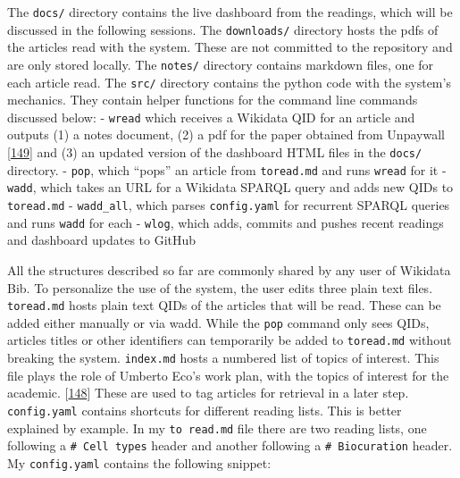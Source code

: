 The \texttt{docs/} directory contains the live dashboard from the readings, which will be discussed in the following sessions.
The \texttt{downloads/} directory hosts the pdfs of the articles read with the system.
These are not committed to the repository and are only stored locally.
The \texttt{notes/} directory contains markdown files, one for each article read.
The \texttt{src/} directory contains the python code with the system's mechanics.
They contain helper functions for the command line commands discussed below:
- \texttt{wread} which receives a Wikidata QID for an article and outputs (1) a notes document, (2) a pdf for the paper obtained from Unpaywall {[}\protect\hyperlink{ref-15luL9zZC}{149}{]} and (3) an updated version of the dashboard HTML files in the \texttt{docs/} directory.
- \texttt{pop}, which ``pops'' an article from \texttt{toread.md} and runs \texttt{wread} for it
- \texttt{wadd}, which takes an URL for a Wikidata SPARQL query and adds new QIDs to \texttt{toread.md}
- \texttt{wadd\_all}, which parses \texttt{config.yaml} for recurrent SPARQL queries and runs \texttt{wadd} for each
- \texttt{wlog}, which adds, commits and pushes recent readings and dashboard updates to GitHub

All the structures described so far are commonly shared by any user of Wikidata Bib.
To personalize the use of the system, the user edits three plain text files.
\texttt{toread.md} hosts plain text QIDs of the articles that will be read.
These can be added either manually or via wadd.
While the \texttt{pop} command only sees QIDs, articles titles or other identifiers can temporarily be added to \texttt{toread.md} without breaking the system.
\texttt{index.md} hosts a numbered list of topics of interest.
This file plays the role of Umberto Eco's work plan, with the topics of interest for the academic. {[}\protect\hyperlink{ref-1HBVPtZGp}{148}{]}
These are used to tag articles for retrieval in a later step.
\texttt{config.yaml} contains shortcuts for different reading lists.
This is better explained by example.
In my \texttt{to\ read.md} file there are two reading lists, one following a \texttt{\#\ Cell\ types} header and another following a \texttt{\#\ Biocuration} header.
My \texttt{config.yaml} contains the following snippet:

\begin{Shaded}
\begin{Highlighting}[]
\KeywordTok{:}
\AttributeTok{  }\KeywordTok{:}
\AttributeTok{  }\KeywordTok{:}
\end{Highlighting}
\end{Shaded}

